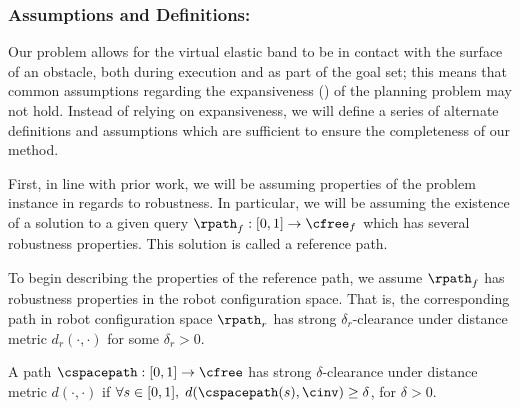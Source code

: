 \subsubsection{Assumptions and Definitions:}
\label{sec:rpath_assumptions}
Our problem allows for the virtual elastic band to be in contact with the surface of an obstacle, both during execution and as part of the goal set; this means that common assumptions regarding the expansiveness (\cite{Hsu1999}) of the planning problem may not hold. Instead of relying on expansiveness, we will define a series of alternate definitions and assumptions which are sufficient to ensure the completeness of our method.



First, in line with prior work, we will be assuming properties of the problem instance in regards to robustness.  In particular, we will be assuming the existence of a solution to a given query $\rpath_f : [0, 1] \rightarrow \cfree_f$ which has several robustness properties.  This solution is called a reference path.






To begin describing the properties of the reference path, we assume $\rpath_f$ has robustness properties in the robot configuration space.  That is, the corresponding path in robot configuration space $\rpath_r$ has strong $\delta_r$-clearance under distance metric $d_r(\cdot,\cdot)$ for some $\delta_r > 0$.

\begin{definition}
    A path $\cspacepath : [0, 1] \rightarrow \cfree$ has strong $\delta$-clearance under distance metric $d(\cdot,\cdot)$ if $\forall s \in [0, 1],\; d(\cspacepath(s),\cinv) \geq \delta$, for $\delta > 0$.
\end{definition}


